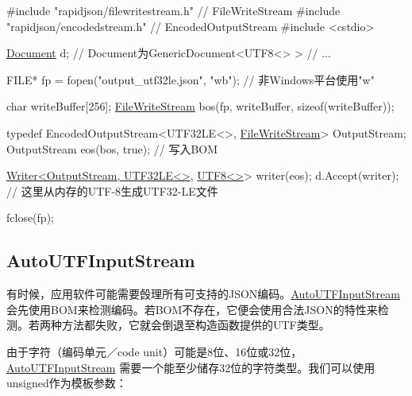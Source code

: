 \begin{DoxyCode}
\textcolor{preprocessor}{#include "rapidjson/filewritestream.h"}  \textcolor{comment}{// FileWriteStream}
\textcolor{preprocessor}{#include "rapidjson/encodedstream.h"}    \textcolor{comment}{// EncodedOutputStream}
\textcolor{preprocessor}{#include <cstdio>}

\hyperlink{class_generic_document}{Document} d;         \textcolor{comment}{// Document为GenericDocument<UTF8<> > }
\textcolor{comment}{// ...}

FILE* fp = fopen(\textcolor{stringliteral}{"output\_utf32le.json"}, \textcolor{stringliteral}{"wb"}); \textcolor{comment}{// 非Windows平台使用"w"}

\textcolor{keywordtype}{char} writeBuffer[256];
\hyperlink{class_file_write_stream}{FileWriteStream} bos(fp, writeBuffer, \textcolor{keyword}{sizeof}(writeBuffer));

\textcolor{keyword}{typedef} EncodedOutputStream<UTF32LE<>, \hyperlink{class_file_write_stream}{FileWriteStream}> OutputStream;
OutputStream eos(bos, \textcolor{keyword}{true});   \textcolor{comment}{// 写入BOM}

\hyperlink{class_writer}{Writer<OutputStream, UTF32LE<>}, \hyperlink{struct_u_t_f8}{UTF8<>}> writer(eos);
d.Accept(writer);   \textcolor{comment}{// 这里从内存的UTF-8生成UTF32-LE文件}

fclose(fp);
\end{DoxyCode}
\hypertarget{md_Cadriciel_Commun_Externe_RapidJSON_doc_stream.zh-cn_AutoUTFInputStream}{}\subsection{Auto\+U\+T\+F\+Input\+Stream}\label{md_Cadriciel_Commun_Externe_RapidJSON_doc_stream.zh-cn_AutoUTFInputStream}
有时候，应用软件可能需要㲃理所有可支持的\+J\+S\+O\+N编码。{\ttfamily \hyperlink{class_auto_u_t_f_input_stream}{Auto\+U\+T\+F\+Input\+Stream}}会先使用\+B\+O\+M来检测编码。若\+B\+O\+M不存在，它便会使用合法\+J\+S\+O\+N的特性来检测。若两种方法都失败，它就会倒退至构造函数提供的\+U\+T\+F类型。

由于字符（编码单元／code unit）可能是8位、16位或32位，{\ttfamily \hyperlink{class_auto_u_t_f_input_stream}{Auto\+U\+T\+F\+Input\+Stream}} 需要一个能至少储存32位的字符类型。我们可以使用{\ttfamily unsigned}作为模板参数：


